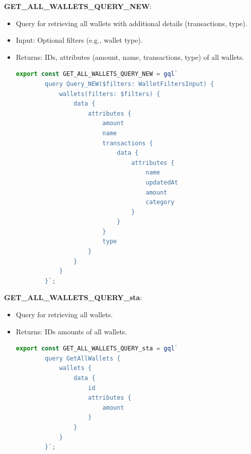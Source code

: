 \item \textbf{GET\_ALL\_WALLETS\_QUERY\_NEW}:
\begin{itemize}
    \item Query for retrieving all wallets with additional details (transactions, type).
    \item Input: Optional filters (e.g., wallet type).
    \item Returns: IDs, attributes (amount, name, transactions, type) of all wallets.
    \begin{lstlisting}[language=TypeScript]
    export const GET_ALL_WALLETS_QUERY_NEW = gql`
        query Query_NEW($filters: WalletFiltersInput) {
            wallets(filters: $filters) {
                data {
                    attributes {
                        amount
                        name
                        transactions {
                            data {
                                attributes {
                                    name
                                    updatedAt
                                    amount
                                    category
                                }
                            }
                        }
                        type
                    }
                }
            }
        }`;
    \end{lstlisting}
\end{itemize}

\item \textbf{GET\_ALL\_WALLETS\_QUERY\_sta}:
\begin{itemize}
    \item Query for retrieving all wallets.
    \item Returns: IDs \newpageand amounts of all wallets.
    \begin{lstlisting}[language=TypeScript]
    export const GET_ALL_WALLETS_QUERY_sta = gql`
        query GetAllWallets {
            wallets {
                data {
                    id
                    attributes {
                        amount
                    }
                }
            }
        }`;
    \end{lstlisting}
\end{itemize}

\newpage







